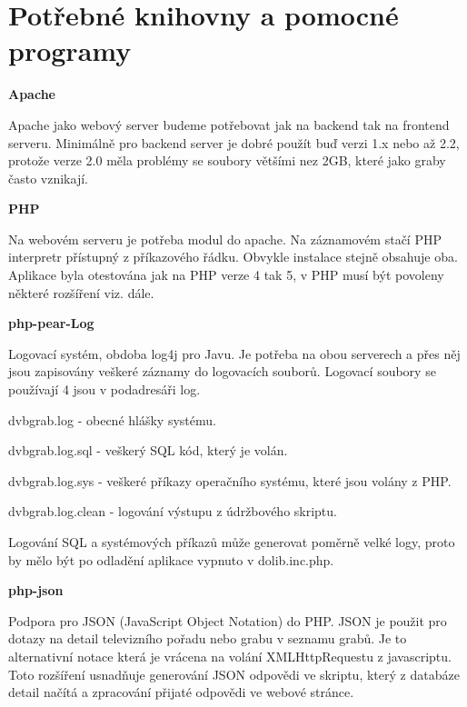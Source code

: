 \section{Potřebné knihovny a pomocné programy}

\vspace{10pt}

\textbf{Apache}

Apache jako webový server budeme potřebovat jak na backend tak na frontend serveru.
Minimálně pro backend server je dobré použít buď verzi 1.x nebo až 2.2, protože verze 2.0 měla problémy se soubory většími nez 2GB, které jako graby často vznikají.

\vspace{10pt}

\textbf{PHP}

Na webovém serveru je potřeba modul do apache. Na záznamovém stačí PHP interpretr přístupný z příkazového řádku. Obvykle instalace stejně obsahuje oba. Aplikace byla otestována jak na PHP verze 4 tak 5, v PHP musí být povoleny některé rozšíření viz. dále.

\vspace{10pt}

\textbf{php-pear-Log}

Logovací systém, obdoba log4j pro Javu. Je potřeba na obou serverech a přes něj jsou zapisovány veškeré záznamy do logovacích souborů. Logovací soubory se používají 4 jsou v podadresáři log.

dvbgrab.log - obecné hlášky systému.

dvbgrab.log.sql - veškerý SQL kód, který je volán.

dvbgrab.log.sys - veškeré příkazy operačního systému, které jsou volány z PHP.

dvbgrab.log.clean - logování výstupu z údržbového skriptu.

Logování SQL a systémových příkazů může generovat poměrně velké logy, proto by mělo být po odladění aplikace vypnuto v dolib.inc.php.

\vspace{10pt}

\textbf{php-json}

Podpora pro JSON (JavaScript Object Notation) do PHP. JSON je použit pro dotazy na detail televizního pořadu nebo grabu v seznamu grabů. Je to alternativní notace která je vrácena na volání XMLHttpRequestu z javascriptu. Toto rozšíření usnadňuje generování JSON odpovědi ve skriptu, který z databáze detail načítá a zpracování přijaté odpovědi ve webové stránce.

